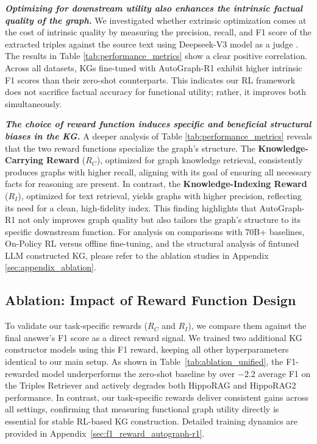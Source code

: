 \documentclass[11pt]{article}
\begin{document}
\textbf{\textit{Optimizing for downstream utility also enhances the intrinsic factual quality of the graph.}} We investigated whether extrinsic optimization comes at the cost of intrinsic quality by measuring the precision, recall, and F1 score of the extracted triples against the source text \citep{huang_can_2025} using Deepseek-V3 model as a judge \citep{deepseek-ai_deepseek-v3_2025}. The results in Table \ref{tab:performance_metrics} show a clear positive correlation. Across all datasets, KGs fine-tuned with AutoGraph-R1 exhibit higher intrinsic F1 scores than their zero-shot counterparts. This indicates our RL framework does not sacrifice factual accuracy for functional utility; rather, it improves both simultaneously.

\textbf{\textit{The choice of reward function induces specific and beneficial structural biases in the KG.}} A deeper analysis of Table \ref{tab:performance_metrics} reveals that the two reward functions specialize the graph's structure. The \textbf{Knowledge-Carrying Reward} ($R_C$), optimized for graph knowledge retrieval, consistently produces graphs with higher recall, aligning with its goal of ensuring all necessary facts for reasoning are present. In contrast, the \textbf{Knowledge-Indexing Reward} ($R_I$), optimized for text retrieval, yields graphs with higher precision, reflecting its need for a clean, high-fidelity index. This finding highlights that AutoGraph-R1 not only improves graph quality but also tailors the graph's structure to its specific downstream function. For analysis on comparisons with 70B+ baselines, On-Policy RL versus offline fine-tuning, and the structural analysis of fintuned LLM constructed KG, please refer to the ablation studies in Appendix \ref{sec:appendix_ablation}.
\subsection{Ablation: Impact of Reward Function Design}
To validate our task-specific rewards ($R_C$ and $R_I$), we compare them against the final answer's F1 score as a direct reward signal. We trained two additional KG constructor models using this F1 reward, keeping all other hyperparameters identical to our main setup. As shown in 
Table~\ref{tab:ablation_unified}, the F1-rewarded model underperforms the zero-shot 
baseline by over $-$2.2 average F1 on the Triples Retriever and actively degrades 
both HippoRAG and HippoRAG2 performance. In contrast, our task-specific rewards 
deliver consistent gains across all settings, confirming that measuring functional 
graph utility directly is essential for stable RL-based KG construction. Detailed 
training dynamics are provided in Appendix~\ref{sec:f1_reward_autograph-r1}. 
\end{document}
